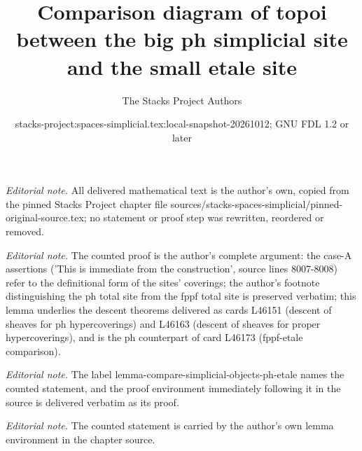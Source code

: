 \documentclass{stacks-project}
\title{Comparison diagram of topoi between the big ph simplicial site and the small etale site}
\author{The Stacks Project Authors}
\date{stacks-project:spaces-simplicial.tex:local-snapshot-20261012; GNU FDL 1.2 or later}
\theoremstyle{plain}
\theoremstyle{definition}
\theoremstyle{remark}
\numberwithin{equation}{subsection}
\begin{document}
\maketitle
\noindent\textit{Editorial note.} All delivered mathematical text is the author's own, copied from the pinned Stacks Project chapter file sources/stacks-spaces-simplicial/pinned-original-source.tex; no statement or proof step was rewritten, reordered or removed.\par\medskip
\noindent\textit{Editorial note.} The counted proof is the author's complete argument: the case-A assertions ('This is immediate from the construction', source lines 8007-8008) refer to the definitional form of the sites' coverings; the author's footnote distinguishing the ph total site from the fppf total site is preserved verbatim; this lemma underlies the descent theorems delivered as cards L46151 (descent of sheaves for ph hypercoverings) and L46163 (descent of sheaves for proper hypercoverings), and is the ph counterpart of card L46173 (fppf-etale comparison).\par\medskip
\noindent\textit{Editorial note.} The label lemma-compare-simplicial-objects-ph-etale names the counted statement, and the proof environment immediately following it in the source is delivered verbatim as its proof.\par\medskip
\noindent\textit{Editorial note.} The counted statement is carried by the author's own lemma environment in the chapter source.\par\medskip
\end{document}
